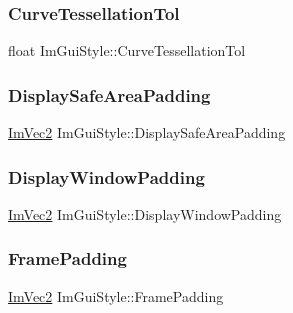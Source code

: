 \subsubsection{\texorpdfstring{Curve\+Tessellation\+Tol}{CurveTessellationTol}}
{\footnotesize\ttfamily float Im\+Gui\+Style\+::\+Curve\+Tessellation\+Tol}

\hypertarget{struct_im_gui_style_a8dd02a6a031ec8667e76aab1e28755bd}{}\label{struct_im_gui_style_a8dd02a6a031ec8667e76aab1e28755bd} 
\subsubsection{\texorpdfstring{Display\+Safe\+Area\+Padding}{DisplaySafeAreaPadding}}
{\footnotesize\ttfamily \hyperlink{struct_im_vec2}{Im\+Vec2} Im\+Gui\+Style\+::\+Display\+Safe\+Area\+Padding}

\hypertarget{struct_im_gui_style_ab06d6f0c6c5f36ab0c14688448de66f6}{}\label{struct_im_gui_style_ab06d6f0c6c5f36ab0c14688448de66f6} 
\subsubsection{\texorpdfstring{Display\+Window\+Padding}{DisplayWindowPadding}}
{\footnotesize\ttfamily \hyperlink{struct_im_vec2}{Im\+Vec2} Im\+Gui\+Style\+::\+Display\+Window\+Padding}

\hypertarget{struct_im_gui_style_af58dc4e954ac95fdb3b0df8efb2fa564}{}\label{struct_im_gui_style_af58dc4e954ac95fdb3b0df8efb2fa564} 
\subsubsection{\texorpdfstring{Frame\+Padding}{FramePadding}}
{\footnotesize\ttfamily \hyperlink{struct_im_vec2}{Im\+Vec2} Im\+Gui\+Style\+::\+Frame\+Padding}

\hypertarget{struct_im_gui_style_a15402cededdef985487e986ccce73ad2}{}\label{struct_im_gui_style_a15402cededdef985487e986ccce73ad2} 
